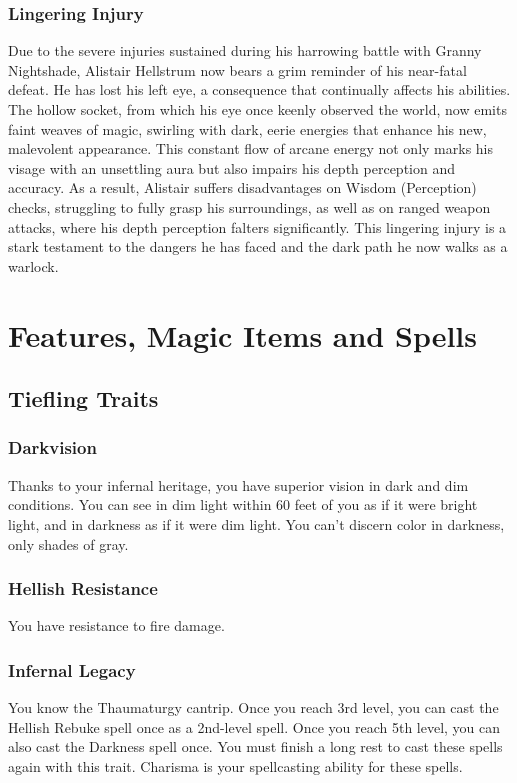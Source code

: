 \documentclass[letterpaper,openany,oneside,twocolumn]{book}
\begin{document}
\subsection*{Lingering Injury}
Due to the severe injuries sustained during his harrowing battle with Granny Nightshade, Alistair Hellstrum now bears a grim reminder of his near-fatal defeat. He has lost his left eye, a consequence that continually affects his abilities. The hollow socket, from which his eye once keenly observed the world, now emits faint weaves of magic, swirling with dark, eerie energies that enhance his new, malevolent appearance. This constant flow of arcane energy not only marks his visage with an unsettling aura but also impairs his depth perception and accuracy. As a result, Alistair suffers disadvantages on Wisdom (Perception) checks, struggling to fully grasp his surroundings, as well as on ranged weapon attacks, where his depth perception falters significantly. This lingering injury is a stark testament to the dangers he has faced and the dark path he now walks as a warlock.

\chapter*{Features, Magic Items and Spells}

\section*{Tiefling Traits}
\subsection*{Darkvision}
Thanks to your infernal heritage, you have superior vision in dark and dim conditions. You can see in dim light within 60 feet of you as if it were bright light, and in darkness as if it were dim light. You can't discern color in darkness, only shades of gray.
\subsection*{Hellish Resistance}
You have resistance to fire damage.
\subsection*{Infernal Legacy}
You know the Thaumaturgy cantrip. Once you reach 3rd level, you can cast the Hellish Rebuke spell once as a 2nd-level spell. Once you reach 5th level, you can also cast the Darkness spell once. You must finish a long rest to cast these spells again with this trait. Charisma is your spellcasting ability for these spells.
\end{document}

